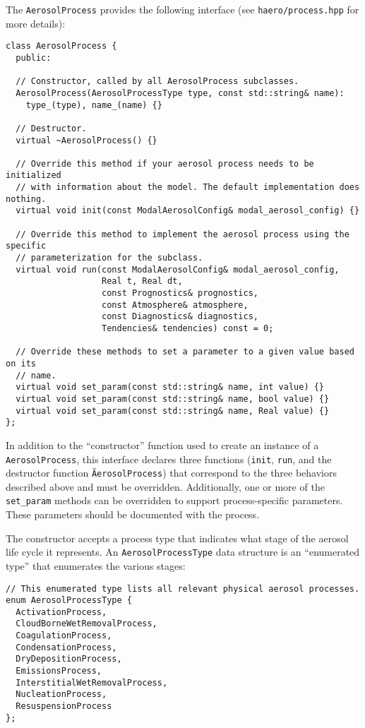 The \texttt{AerosolProcess} provides the following interface (see
\texttt{haero/process.hpp} for more details):

\begin{lstlisting}
class AerosolProcess {
  public:

  // Constructor, called by all AerosolProcess subclasses.
  AerosolProcess(AerosolProcessType type, const std::string& name):
    type_(type), name_(name) {}

  // Destructor.
  virtual ~AerosolProcess() {}

  // Override this method if your aerosol process needs to be initialized
  // with information about the model. The default implementation does nothing.
  virtual void init(const ModalAerosolConfig& modal_aerosol_config) {}

  // Override this method to implement the aerosol process using the specific
  // parameterization for the subclass.
  virtual void run(const ModalAerosolConfig& modal_aerosol_config,
                   Real t, Real dt,
                   const Prognostics& prognostics,
                   const Atmosphere& atmosphere,
                   const Diagnostics& diagnostics,
                   Tendencies& tendencies) const = 0;

  // Override these methods to set a parameter to a given value based on its
  // name.
  virtual void set_param(const std::string& name, int value) {}
  virtual void set_param(const std::string& name, bool value) {}
  virtual void set_param(const std::string& name, Real value) {}
};
\end{lstlisting}

In addition to the ``constructor'' function used to create an instance of a
\texttt{AerosolProcess}, this interface declares three functions (\texttt{init},
\texttt{run}, and the destructor function \texttt{\~AerosolProcess})
that correspond to the three behaviors described above and must be overridden.
Additionally, one or more of the \texttt{set\_param} methods can be overridden
to support process-specific parameters. These parameters should be documented
with the process.

The constructor accepts a process type that indicates what stage of the aerosol
life cycle it represents. An \texttt{AerosolProcessType} data structure is an
``enumerated type'' that enumerates the various stages:

\begin{lstlisting}
// This enumerated type lists all relevant physical aerosol processes.
enum AerosolProcessType {
  ActivationProcess,
  CloudBorneWetRemovalProcess,
  CoagulationProcess,
  CondensationProcess,
  DryDepositionProcess,
  EmissionsProcess,
  InterstitialWetRemovalProcess,
  NucleationProcess,
  ResuspensionProcess
};
\end{lstlisting}

